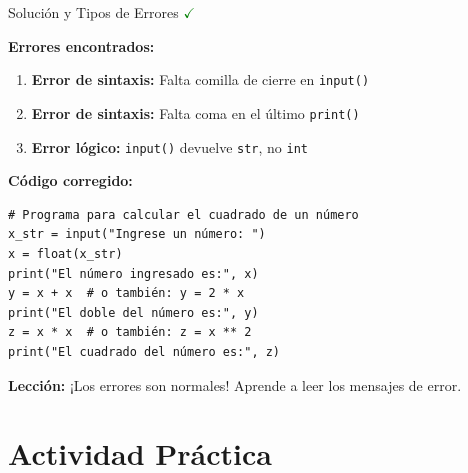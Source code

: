 \documentclass[10pt]{beamer}
\begin{document}
\begin{frame}[fragile]{Solución y Tipos de Errores \hfill \textcolor{green}{$\checkmark$}}

\textbf{Errores encontrados:}
\begin{enumerate}
  \item \textbf{Error de sintaxis:} Falta comilla de cierre en \texttt{input()}
  \item \textbf{Error de sintaxis:} Falta coma en el último \texttt{print()}
  \item \textbf{Error lógico:} \texttt{input()} devuelve \texttt{str}, no \texttt{int}
\end{enumerate}

\textbf{Código corregido:}
\begin{verbatim}
# Programa para calcular el cuadrado de un número
x_str = input("Ingrese un número: ")
x = float(x_str)
print("El número ingresado es:", x)
y = x + x  # o también: y = 2 * x
print("El doble del número es:", y)
z = x * x  # o también: z = x ** 2
print("El cuadrado del número es:", z)
\end{verbatim}

\textbf{Lección:} ¡Los errores son normales! Aprende a leer los mensajes de error.
\end{frame}



\section{Actividad Práctica}

\end{document}
